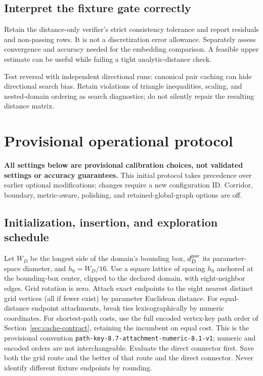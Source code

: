 \documentclass[11pt,letterpaper]{article}
\newcommand{\src}[1]{\nolinkurl{#1}}
\begin{document}
\subsection{Interpret the fixture gate correctly}
Retain the distance-only verifier's strict consistency tolerance and report residuals and non-passing rows. It is not a discretization error allowance. Separately assess convergence and accuracy needed for the embedding comparison. A feasible upper estimate can be useful while failing a tight analytic-distance check.

Test reversal with independent directional runs: canonical pair caching can hide directional search bias. Retain violations of triangle inequalities, scaling, and nested-domain ordering as search diagnostics; do not silently repair the resulting distance matrix.

\clearpage
\section{Provisional operational protocol}\label{sec:protocol}
\textbf{All settings below are provisional calibration choices, not validated settings or accuracy guarantees.} This initial protocol takes precedence over earlier optional modifications; changes require a new configuration ID. Corridor, boundary, metric-aware, polishing, and retained-global-graph options are off.

\subsection{Initialization, insertion, and exploration schedule}
Let $W_D$ be the longest side of the domain's bounding box, $d_D^{\rm par}$ its parameter-space diameter, and $h_0=W_D/16$. Use a square lattice of spacing $h_0$ anchored at the bounding-box center, clipped to the declared domain, with eight-neighbor edges. Grid rotation is zero. Attach exact endpoints to the eight nearest distinct grid vertices (all if fewer exist) by parameter Euclidean distance. For equal-distance endpoint attachments, break ties lexicographically by numeric coordinates. For shortest-path costs, use the full encoded vertex-key path order of Section~\ref{sec:cache-contract}, retaining the incumbent on equal cost. This is the provisional convention \src{path-key-8.7-attachment-numeric-8.1-v1}; numeric and encoded orders are not interchangeable. Evaluate the direct connector first. Save both the grid route and the better of that route and the direct connector. Never identify different fixture endpoints by rounding.
\end{document}
